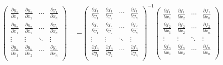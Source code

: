\documentclass[dvipdfmx]{jsarticle}
\begin{document}
\begin{align*}
\begin{pmatrix}
  \frac{\partial y_{1}}{\partial x_{1}} & \frac{\partial y_{1}}{\partial x_{2}} & \cdots & \frac{\partial y_{1}}{\partial x_{n}} \\
  \frac{\partial y_{2}}{\partial x_{1}} & \frac{\partial y_{2}}{\partial x_{2}} & \cdots & \frac{\partial y_{2}}{\partial x_{n}} \\
     \vdots & \vdots & \ddots & \vdots \\
  \frac{\partial y_{n}}{\partial x_{1}} & \frac{\partial y_{n}}{\partial x_{2}} & \cdots & \frac{\partial y_{n}}{\partial x_{n}} \\
    \end{pmatrix} = - \begin{pmatrix}
  \frac{\partial f_{1}}{\partial y_{1}} & \frac{\partial f_{1}}{\partial y_{2}} & \cdots & \frac{\partial f_{1}}{\partial y_{n}} \\
  \frac{\partial f_{2}}{\partial y_{1}} & \frac{\partial f_{2}}{\partial y_{2}} & \cdots & \frac{\partial f_{2}}{\partial y_{n}} \\
     \vdots & \vdots & \ddots & \vdots \\
  \frac{\partial f_{n}}{\partial y_{1}} & \frac{\partial f_{n}}{\partial y_{2}} & \cdots & \frac{\partial f_{n}}{\partial y_{n}} \\
\end{pmatrix}^{- 1}
\begin{pmatrix}
  \frac{\partial f_{1}}{\partial x_{1}} & \frac{\partial f_{1}}{\partial x_{2}} & \cdots & \frac{\partial f_{1}}{\partial x_{n}} \\
  \frac{\partial f_{2}}{\partial x_{1}} & \frac{\partial f_{2}}{\partial x_{2}} & \cdots & \frac{\partial f_{2}}{\partial x_{n}} \\
     \vdots & \vdots & \ddots & \vdots \\
  \frac{\partial f_{n}}{\partial x_{1}} & \frac{\partial f_{n}}{\partial x_{2}} & \cdots & \frac{\partial f_{n}}{\partial x_{n}} \\
\end{pmatrix}
\end{align*}
\end{document}
